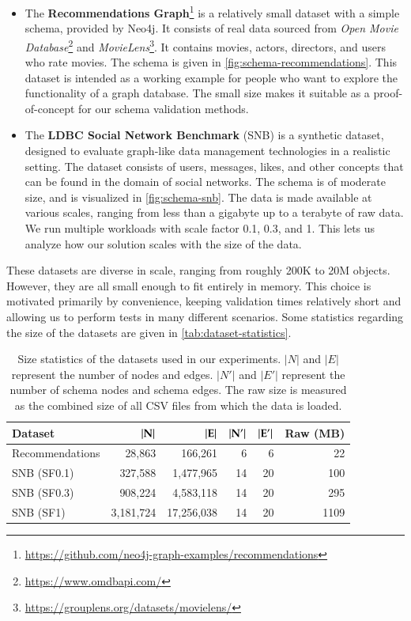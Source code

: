 \documentclass{report}
\theoremstyle{definition}
\begin{document}
\begin{itemize}
  \item The \textbf{Recommendations Graph}\footnote{\url{https://github.com/neo4j-graph-examples/recommendations}} is a relatively small dataset with a simple schema, provided by Neo4j. It consists of real data sourced from \emph{Open Movie Database}\footnote{\url{https://www.omdbapi.com/}} and \emph{MovieLens}\footnote{\url{https://grouplens.org/datasets/movielens/}}. It contains movies, actors, directors, and users who rate movies. The schema is given in \autoref{fig:schema-recommendations}. This dataset is intended as a working example for people who want to explore the functionality of a graph database. The small size makes it suitable as a proof-of-concept for our schema validation methods.
  \item The \textbf{LDBC Social Network Benchmark} (SNB) \citep{angles2020snb} is a synthetic dataset, designed to evaluate graph-like data management technologies in a realistic setting. The dataset consists of users, messages, likes, and other concepts that can be found in the domain of social networks. The schema is of moderate size, and is visualized in \autoref{fig:schema-snb}. The data is made available at various scales, ranging from less than a gigabyte up to a terabyte of raw data. We run multiple workloads with scale factor 0.1, 0.3, and 1. This lets us analyze how our solution scales with the size of the data.
\end{itemize}

These datasets are diverse in scale, ranging from roughly 200K to 20M objects. However, they are all small enough to fit entirely in memory. This choice is motivated primarily by convenience, keeping validation times relatively short and allowing us to perform tests in many different scenarios. Some statistics regarding the size of the datasets are given in \autoref{tab:dataset-statistics}.

\begin{table}[t]
  \centering
  \begin{tabular}{lrrrrr}
    \hline
    \textbf{Dataset} & $\bf{|N|}$ & $\bf{|E|}$ & $\bf{|N'|}$ & $\bf{|E'|}$ & \textbf{Raw (MB)} \\
    \hline
    Recommendations  & 28,863     & 166,261    & 6           & 6           & 22                \\
    SNB (SF0.1)      & 327,588    & 1,477,965  & 14          & 20          & 100               \\
    SNB (SF0.3)      & 908,224    & 4,583,118  & 14          & 20          & 295               \\
    SNB (SF1)        & 3,181,724  & 17,256,038 & 14          & 20          & 1109              \\
    \hline
  \end{tabular}
  \caption[SIze statistics of the datasets used in our experiments]{Size statistics of the datasets used in our experiments. $|N|$ and $|E|$ represent the number of nodes and edges. $|N'|$ and $|E'|$ represent the number of schema nodes and schema edges. The raw size is measured as the combined size of all CSV files from which the data is loaded.}
  \label{tab:dataset-statistics}
\end{table}
\end{document}
